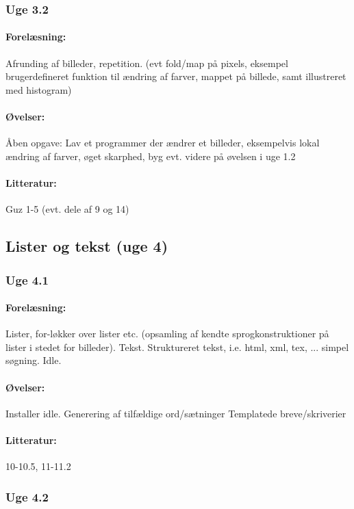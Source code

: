 \documentclass[12pt]{article}
\begin{document}
\subsubsection{Uge 3.2}
\paragraph{Forelæsning:} 
Afrunding af billeder, repetition.
(evt fold/map på pixels, eksempel brugerdefineret funktion til ændring af farver, mappet på billede, samt illustreret med histogram)

\paragraph{Øvelser:}
Åben opgave: Lav et programmer der ændrer et billeder,
eksempelvis lokal ændring af farver, øget skarphed,
byg evt. videre på øvelsen i uge 1.2
\paragraph{Litteratur:} Guz 1-5 (evt. dele af 9 og 14)

\subsection{Lister og tekst (uge 4)}
\subsubsection{Uge 4.1}
\paragraph{Forelæsning:} 
Lister, for-løkker over lister etc. (opsamling af kendte sprogkonstruktioner på lister i stedet for billeder).
Tekst. Struktureret tekst, i.e. html, xml, tex, ... simpel søgning.
Idle.
\paragraph{Øvelser:}
Installer idle.
Generering af tilfældige ord/sætninger
Templatede breve/skriverier
\paragraph{Litteratur:} 10-10.5, 11-11.2

\subsubsection{Uge 4.2}
\end{document}
